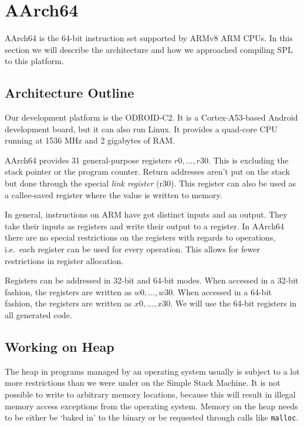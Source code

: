 \chapter{AArch64}

AArch64 is the 64-bit instruction set supported by ARMv8 ARM CPUs.
In this section we will describe the architecture and how we approached compiling SPL to this platform.

\section{Architecture Outline}

Our development platform is the ODROID-C2.
It is a Cortex-A53-based Android development board, but it can also run Linux.
It provides a quad-core CPU running at 1536 MHz and 2 gigabytes of RAM\@.

AArch64 provides 31 general-purpose registers $r0, \ldots, r30$.
This is excluding the stack pointer or the program counter.
Return addresses aren't put on the stack but done through the special \emph{link register} (r30).
This register can also be used as a callee-saved register where the value is written to memory.

In general, instructions on ARM have got distinct inputs and an output.
They take their inputs as registers and write their output to a register.
In AArch64 there are no special restrictions on the registers with regards to operations, i.e.\ each register can be used for every operation.
This allows for fewer restrictions in register allocation.

Registers can be addressed in 32-bit and 64-bit modes.
When accessed in a 32-bit fashion, the registers are written as $w0, \ldots, w30$.
When accessed in a 64-bit fashion, the registers are written as $x0, \ldots, x30$.
We will use the 64-bit registers in all generated code.

\section{Working on Heap}

The heap in programs managed by an operating system usually is subject to a lot more restrictions than we were under on the Simple Stack Machine.
It is not possible to write to arbitrary memory locations, because this will result in illegal memory access exceptions from the operating system.
Memory on the heap needs to be either be `baked in' to the binary or be requested through calls like \texttt{malloc}.

